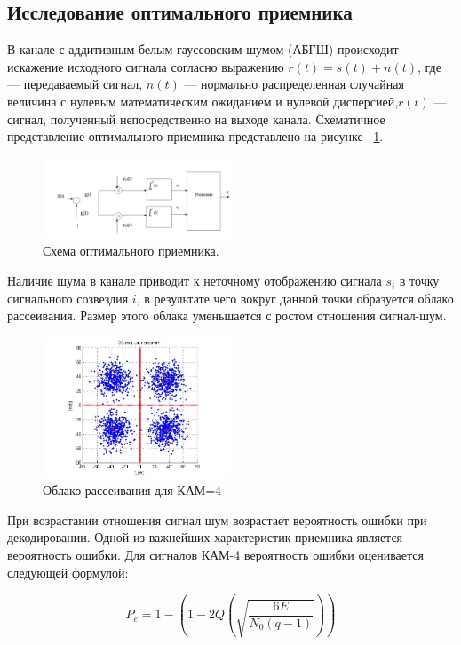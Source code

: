 \subsection{Исследование оптимального приемника}

В канале с аддитивным белым гауссовским шумом (АБГШ) происходит искажение исходного сигнала согласно выражению  $r(t)=s(t)+n(t)$, где --- передаваемый сигнал, $n(t)$ --- нормально распределенная случайная величина с нулевым математическим ожиданием и нулевой дисперсией,$r(t)$ --- сигнал, полученный непосредственно на выходе канала.
Схематичное представление оптимального приемника представлено на рисунке ~\ref{fig:mal7}.

 \begin{figure}[H]
	\centering
	\includegraphics[width=0.5\textwidth]{img/mal7}
	\caption{Схема оптимального приемника.}
	\label{fig:mal7}
\end{figure} 
Наличие шума в канале приводит к  неточному отображению сигнала $s_{i}$  в точку сигнального созвездия $i$, в результате чего вокруг данной точки образуется облако рассеивания. Размер этого облака уменьшается с ростом отношения сигнал-шум.
 \begin{figure}[H]
	\centering
	\includegraphics[width=0.5\textwidth]{img/mal8}
	\caption{Облако рассеивания для КАМ=4}
	\label{fig:mal8}
\end{figure} 
При возрастании отношения сигнал шум возрастает вероятность ошибки при декодировании.
Одной из важнейших характеристик приемника является вероятность ошибки. Для сигналов КАМ-4 вероятность ошибки оценивается следующей формулой:

\begin{equation}
P_{e}=1-(1-2Q(\sqrt{\dfrac{6E}{N_{0}(q-1)}}))
\end{equation}
 
